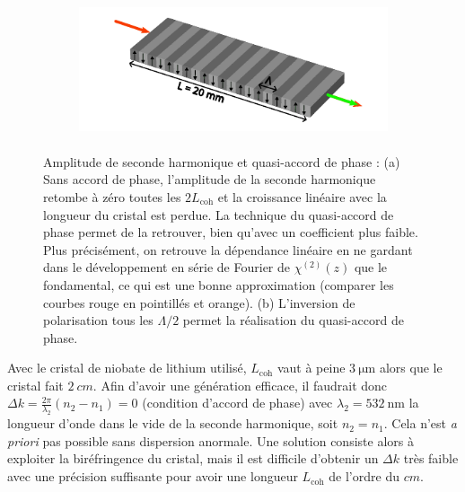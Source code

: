 \documentclass[11pt,a4paper]{article}
\newcommand{\lmbd}[1]{$\SI{#1}{\nano\metre}$}
\newcommand{\mathsc}[1]{\mathrm{\scriptscriptstyle {#1}}}
\begin{document}
\begin{figure}[htpb] 
\centering
\begin{subfigure}[b]{0.48\textwidth}
	\centering
	\hspace*{-0.8cm}
	
	\vspace*{-1cm}
	\caption{}
	\label{fig:agen}
\end{subfigure}
\begin{subfigure}[b]{0.48\textwidth}
	\includegraphics[height=4cm]{./img/PP.pdf}
	\vspace*{0.8cm}
	\caption{}
	\label{fig:inversion}
\end{subfigure}
\hspace*{-0.6cm}
\caption{Amplitude de seconde harmonique et quasi-accord de phase : (a) \small  Sans accord de phase, l'amplitude de la seconde harmonique retombe à zéro toutes les $2L_\mathsc{coh}$ et la croissance linéaire avec la longueur du cristal est perdue. La technique du quasi-accord de phase permet de la retrouver, bien qu'avec un coefficient plus faible. Plus précisément, on retrouve la dépendance linéaire en ne gardant dans le développement en série de Fourier de $\chi^{(2)}(z)$ que le fondamental, ce qui est une bonne approximation (comparer les courbes rouge en pointillés et orange).  (b) L'inversion de polarisation tous les $\Lambda/2$ permet la réalisation du quasi-accord de phase.} %
\label{fig:QPM}
\vspace{-0.5cm}
\end{figure}

Avec le cristal de niobate de lithium utilisé, $L_\mathsc{coh}$ vaut à peine $\SI{3}{\micro\meter}$ alors que le cristal fait $\SI{2}{cm}$.
Afin d'avoir une génération efficace, il faudrait donc $\Delta k = \frac{2\pi}{\lambda_2}(n_2-n_1) = 0$ (condition d'accord de phase) avec $\lambda_2=$\lmbd{532} la longueur d'onde dans le vide de la seconde harmonique, soit $n_2 = n_1$. Cela n'est \textit{a priori} pas possible sans dispersion anormale. Une solution consiste alors à exploiter la biréfringence du cristal, mais il est difficile d'obtenir un $\Delta k$ très faible avec une précision suffisante pour avoir une longueur $L_\mathsc{coh}$ de l'ordre du $\unit{cm}$. 
\end{document}
